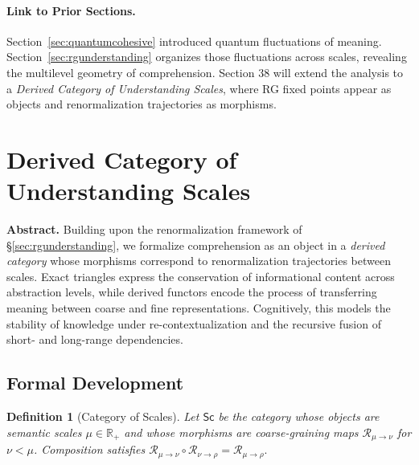 \documentclass[12pt,a4paper,twoside,openright]{book}
\newtheorem{definition}[theorem]{Definition}
\begin{document}
\paragraph{Link to Prior Sections.}
Section~\ref{sec:quantumcohesive} introduced quantum fluctuations of meaning.
Section~\ref{sec:rgunderstanding} organizes those fluctuations across scales,
revealing the multilevel geometry of comprehension.
Section 38 will extend the analysis to
a \emph{Derived Category of Understanding Scales},
where RG fixed points appear as objects
and renormalization trajectories as morphisms.


\section{Derived Category of Understanding Scales}
\label{sec:derivedcategory}

\textbf{Abstract.}
Building upon the renormalization framework of §\ref{sec:rgunderstanding},
we formalize comprehension as an object in a \emph{derived category}
whose morphisms correspond to renormalization trajectories between scales.
Exact triangles express the conservation of informational content
across abstraction levels, while derived functors encode the process
of transferring meaning between coarse and fine representations.
Cognitively, this models the stability of knowledge under re-contextualization
and the recursive fusion of short- and long-range dependencies.

\subsection*{Formal Development}

\begin{definition}[Category of Scales]
Let $\mathsf{Sc}$ be the category whose objects are semantic scales
$\mu\in\mathbb{R}_+$ and whose morphisms are coarse-graining maps
$\mathcal{R}_{\mu\to\nu}$ for $\nu<\mu$.
Composition satisfies
\(
\mathcal{R}_{\mu\to\nu}\circ\mathcal{R}_{\nu\to\rho}
=\mathcal{R}_{\mu\to\rho}.
\)
\end{definition}
\end{document}
